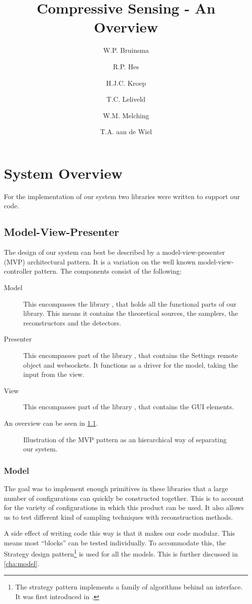 \documentclass[a4paper, openany, oneside]{memoir}
\title{Compressive Sensing - An Overview}
\author{W.P. Bruinsma \and R.P. Hes \and H.J.C. Kroep \and T.C. Leliveld \and W.M. Melching \and T.A. aan de Wiel}
\begin{document}
\chapter{System Overview}
For the implementation of our system two libraries were written to support our code.

\section{Model-View-Presenter}
\label{sec:model-view-presenter}
The design of our system can best be described by a model-view-presenter (MVP) architectural pattern. It is a variation on the well known model-view-controller pattern. The components consist of the following:
\begin{description}
    \item[Model] This encompasses the library , that holds all the functional parts of our library. This means it contains the theoretical sources, the samplers, the reconstructors and the detectors.
    \item[Presenter] This encompasses part of the library , that contains the Settings remote object and websockets. It functions as a driver for the model, taking the input from the view.
    \item[View] This encompasses part of the library , that contains the GUI elements.
\end{description}
An overview can be seen in \cref{fig:MVP}.

\begin{figure}
    \centering
    
    \caption{Illustration of the MVP pattern as an hierarchical way of separating our system.}
    \label{fig:MVP}
\end{figure}

\subsection{Model}
\label{sub:model}
The goal was to implement enough primitives in these libraries that a large number of configurations can quickly be constructed together. This is to account for the variety of configurations in which this product can be used. It also allows us to test different kind of sampling techniques with reconstruction methods.

A side effect of writing code this way is that it makes our code modular. This means most ``blocks'' can be tested individually. To accommodate this, the Strategy design pattern\footnote{The strategy pattern implements a family of algorithms behind an interface. It was first introduced in \cite{designpatterns}.} is used for all the models. This is further discussed in \cref{cha:model}.
\end{document}
